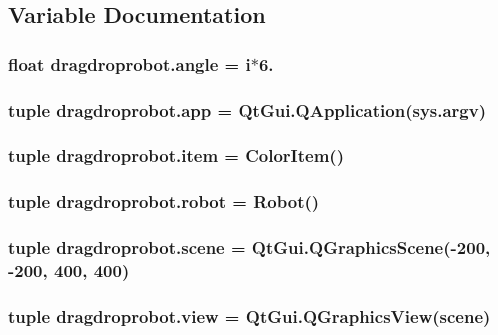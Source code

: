 \subsection{Variable Documentation}
\hypertarget{namespacedragdroprobot_addd88cde04ffea0df28abd28bae2d2c4}{}
\subsubsection[{angle}]{\setlength{\rightskip}{0pt plus 5cm}float dragdroprobot.\+angle = {\bf i}$\ast$6.}\label{namespacedragdroprobot_addd88cde04ffea0df28abd28bae2d2c4}
\hypertarget{namespacedragdroprobot_a18b417c946f7007c53deddcb96137219}{}
\subsubsection[{app}]{\setlength{\rightskip}{0pt plus 5cm}tuple dragdroprobot.\+app = Qt\+Gui.\+Q\+Application(sys.\+argv)}\label{namespacedragdroprobot_a18b417c946f7007c53deddcb96137219}
\hypertarget{namespacedragdroprobot_a850fdc111a8a5222976694c1e8a7727d}{}
\subsubsection[{item}]{\setlength{\rightskip}{0pt plus 5cm}tuple dragdroprobot.\+item = {\bf Color\+Item}()}\label{namespacedragdroprobot_a850fdc111a8a5222976694c1e8a7727d}
\hypertarget{namespacedragdroprobot_a6203faed027850ae88dc75bf58316b6e}{}
\subsubsection[{robot}]{\setlength{\rightskip}{0pt plus 5cm}tuple dragdroprobot.\+robot = {\bf Robot}()}\label{namespacedragdroprobot_a6203faed027850ae88dc75bf58316b6e}
\hypertarget{namespacedragdroprobot_a7d111d9dd0962512b83974b850387a1c}{}
\subsubsection[{scene}]{\setlength{\rightskip}{0pt plus 5cm}tuple dragdroprobot.\+scene = Qt\+Gui.\+Q\+Graphics\+Scene(-\/200, -\/200, 400, 400)}\label{namespacedragdroprobot_a7d111d9dd0962512b83974b850387a1c}
\hypertarget{namespacedragdroprobot_a14fd3f9b1d3a85c32220c4414941ccb1}{}
\subsubsection[{view}]{\setlength{\rightskip}{0pt plus 5cm}tuple dragdroprobot.\+view = Qt\+Gui.\+Q\+Graphics\+View({\bf scene})}\label{namespacedragdroprobot_a14fd3f9b1d3a85c32220c4414941ccb1}
